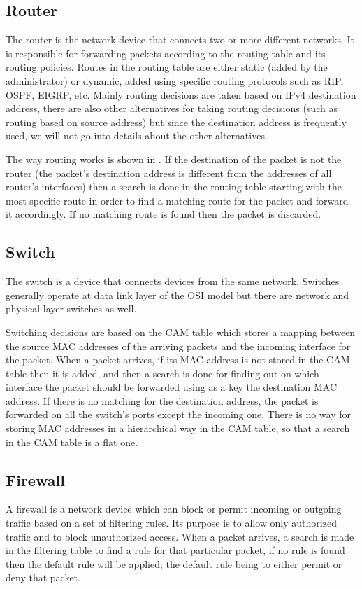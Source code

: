 \subsection{Router}
\label{sub-sec:router}
The router is the network device that connects two or more different networks. It is responsible for 
forwarding packets according to the routing table and its routing policies. Routes in the routing table 
are either static (added by the administrator) or dynamic, added using specific routing protocols such as RIP, OSPF, EIGRP, etc.
Mainly routing decisions are taken based on IPv4 destination address, there are also other alternatives for taking routing 
decisions (such as routing based on source address) but since the destination address is frequently used, 
we will not go into details about the other alternatives. 

The way routing works is shown in .
If the destination of the packet is not the router (the packet's destination address is different from the 
addresses of all router's interfaces) then a search is done in the routing table starting with the most 
specific route in order to find a matching route for the packet and forward it accordingly. If no
matching route is found then the packet is discarded.
\subsection{Switch}
\label{sub-sec:switch}
The switch is a device that connects devices from the same network. Switches generally operate at 
data link layer of the OSI model but there are network and physical layer switches as well. 

Switching decisions are based on the CAM table which stores a mapping between the source MAC addresses 
of the arriving packets and the incoming interface for the packet. When a packet arrives, if its 
MAC address is not stored in the CAM table then it is added, and then a search is done for finding 
out on which interface the packet should be forwarded using as a key the destination MAC address. If there is no matching for the destination address, the packet is forwarded on all the switch's ports except the incoming one.
There is no way for storing MAC addresses in a hierarchical way in the CAM table, so that a search in 
the CAM table is a flat one.     

\subsection{Firewall}
\label{sub-sec:firewall}
A firewall is a network device which can block or permit incoming or outgoing traffic based on a set 
of filtering rules. Its purpose is to allow only authorized traffic and to block unauthorized access.
When a packet arrives, a search is made in the filtering table to find a rule for that particular packet, 
if no rule is found then the default rule will be applied, the default rule being to either permit or deny 
that packet. 

